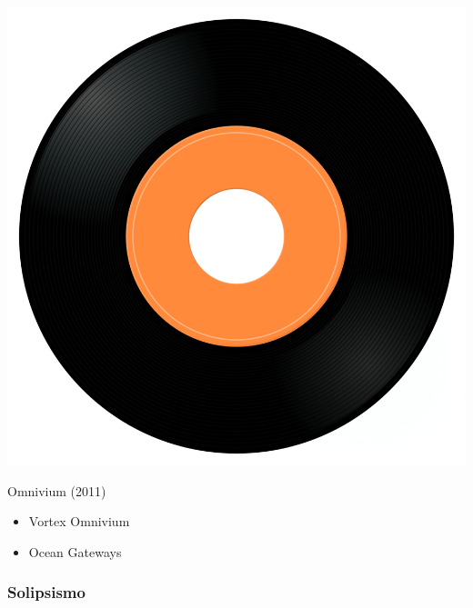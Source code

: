 \begin{minipage}[t]{0.25\textwidth}\vspace{0pt}
\captionsetup{type=figure}
\includegraphics[width=\textwidth]{Images/cover.png}
\caption*{Omnivium (2011)}
\end{minipage}
\begin{minipage}[t]{0.25\textwidth}\vspace{0pt}
\begin{itemize}[nosep,leftmargin=1em,labelwidth=*,align=left]
	\setlength{\itemsep}{0pt}
	\item Vortex Omnivium
	\item Ocean Gateways
\end{itemize}
\end{minipage}

\subsubsection{Solipsismo}

